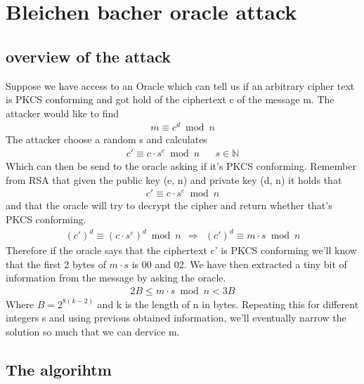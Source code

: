 \documentclass[../master.tex]{subfiles}
\begin{document}
    \section{Bleichen bacher oracle attack}
    \subsection{overview of the attack}
    Suppose we have access to an Oracle which can tell us if an arbitrary cipher text is PKCS conforming and got hold
    of the ciphertext c of the message m.
    The attacker would like to find
    \begin{align*}
        m \equiv c^d \bmod n
    \end{align*}
    The attacker choose a random s and calculates
    \begin{align*}
        c' \equiv c \cdot s^e \bmod n && s \in \mathbb{N}
    \end{align*}
    Which can then be send to the oracle asking if it's PKCS conforming.
    Remember from RSA that given the public key (e, n) and private key (d, n) it holds that
    \begin{align*}
        c' \equiv c \cdot s^e \bmod n
    \end{align*}
    and that the oracle will try to decrypt the cipher and return whether that's PKCS conforming.
    \begin{align*}
    (c')^d \equiv (c \cdot s^e)^d \bmod n \ \ \Rightarrow \ \ (c')^d \equiv m \cdot s \bmod n
    \end{align*}
    Therefore if the oracle says that the ciphertext c' is PKCS conforming
    we'll know that the first 2 bytes of $m \cdot s$ is 00 and 02.
    We have then extracted a tiny bit of information from the message by asking the oracle.
    \begin{align*}
        2B \leq m \cdot s \bmod n < 3B
    \end{align*}
    Where $B = 2^{8(k-2)}$ and k is the length of n in bytes.
    Repeating this for different integers s and using previous obtained information,
    we'll eventually narrow the solution so much that we can dervice m.


    \subsection{The algorihtm}
\end{document}
